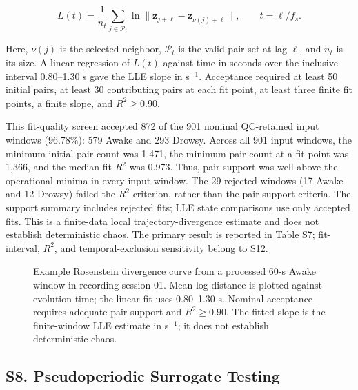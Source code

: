\[
L(t)=\frac{1}{n_t}\sum_{j\in\mathcal{P}_t}\ln\|\mathbf{z}_{j+\ell}-\mathbf{z}_{\nu(j)+\ell}\|,\qquad t=\ell/f_s.
\]

Here, $\nu(j)$ is the selected neighbor, $\mathcal{P}_t$ is the valid pair set at lag $\ell$, and $n_t$ is its size. A linear regression of $L(t)$ against time in seconds over the inclusive interval 0.80--1.30 s gave the LLE slope in s$^{-1}$. Acceptance required at least 50 initial pairs, at least 30 contributing pairs at each fit point, at least three finite fit points, a finite slope, and $R^2\geq0.90$.

This fit-quality screen accepted 872 of the 901 nominal QC-retained input windows (96.78\%): 579 Awake and 293 Drowsy. Across all 901 input windows, the minimum initial pair count was 1,471, the minimum pair count at a fit point was 1,366, and the median fit $R^2$ was 0.973. Thus, pair support was well above the operational minima in every input window. The 29 rejected windows (17 Awake and 12 Drowsy) failed the $R^2$ criterion, rather than the pair-support criteria. The support summary includes rejected fits; LLE state comparisons use only accepted fits. This is a finite-data local trajectory-divergence estimate and does not establish deterministic chaos. The primary result is reported in Table S7; fit-interval, $R^2$, and temporal-exclusion sensitivity belong to S12.

\begin{figure}[p]
\centering
\caption{Example Rosenstein divergence curve from a processed 60-s Awake window in recording session 01. Mean log-distance is plotted against evolution time; the linear fit uses 0.80--1.30 s. Nominal acceptance requires adequate pair support and $R^2\geq0.90$. The fitted slope is the finite-window LLE estimate in s$^{-1}$; it does not establish deterministic chaos.}
\label{fig:supp_lle}
\end{figure}

\subsection*{S8. Pseudoperiodic Surrogate Testing}

